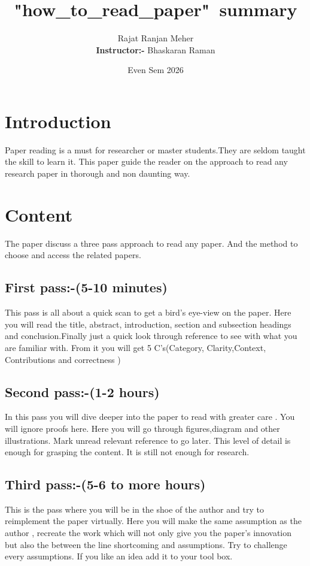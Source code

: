 \documentclass{article}
\title{"how\_to\_read\_paper"\ summary}
\author{Rajat Ranjan Meher \\ [0.2cm]
\textbf{Instructor:-} Bhaskaran Raman
}
\date{Even Sem 2026}
\begin{document}
\maketitle

\section{Introduction}
Paper reading is a must for researcher or master students.They are seldom taught the skill to learn it. This paper guide the reader on the approach to read any research paper in thorough and non daunting way.
\section{Content}
The paper discuss a three pass approach to read any paper. And the method to choose and access the related papers.

 \subsection{First pass:-(5-10 minutes)}This pass is all about a quick scan to get a bird's eye-view on the paper. Here you will read the title, abstract, introduction, section and subsection headings and conclusion.Finally just a quick look through reference to see with what you are familiar with.
From it you will get 5 C's(Category, Clarity,Context, Contributions and correctness )

 \subsection{Second pass:-(1-2 hours)}
In this pass you will dive deeper into the paper to read with greater care . You will ignore proofs here. Here you will go through figures,diagram and other illustrations. Mark unread relevant reference to go later. This level of detail is enough for grasping the content. It is still not enough for research. 

 \subsection{Third pass:-(5-6 to more hours)}
This is the pass where you will be in the shoe of the author and try to reimplement the paper virtually. Here you will make the same assumption as the author , recreate the work which will not only give you the paper's innovation but also the between the line shortcoming and assumptions. Try to challenge every assumptions. If you like an idea add it to your tool box. 
\end{document}

